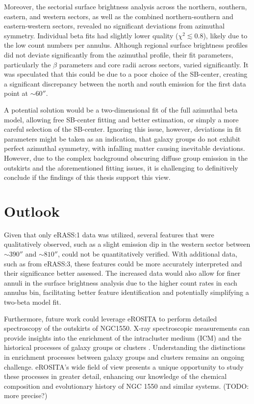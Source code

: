 Moreover, the sectorial surface brightness analysis across the northern, southern, eastern, and western sectors, as well as the combined northern-southern and eastern-western sectors, revealed no significant deviations from azimuthal symmetry. Individual beta fits had slightly lower quality (\(\chi^2 \lesssim 0.8\)), likely due to the low count numbers per annulus. Although regional surface brightness profiles did not deviate significantly from the azimuthal profile, their fit parameters, particularly the \(\beta\) parameters and core radii across sectors, varied significantly. It was speculated that this could be due to a poor choice of the SB-center, creating a significant discrepancy between the north and south emission for the first data point at \(\sim 60''\). 

A potential solution would be a two-dimensional fit of the full azimuthal beta model, allowing free SB-center fitting and better estimation, or simply a more careful selection of the SB-center. Ignoring this issue, however, deviations in fit parameters might be taken as an indication, that galaxy groups do not exhibit perfect azimuthal symmetry, with infalling matter causing inevitable deviations. However, due to the complex background obscuring diffuse group emission in the outskirts and the aforementioned fitting issues, it is challenging to definitively conclude if the findings of this thesis support this view.
\section{Outlook}
Given that only eRASS:1 data was utilized, several features that were qualitatively observed, such as a slight emission dip in the western sector between \(\sim 390''\) and \(\sim 810''\), could not be quantitatively verified. With additional data, such as from eRASS:3, these features could be more accurately interpreted and their significance better assessed. The increased data would also allow for finer annuli in the surface brightness analysis due to the higher count rates in each annulus bin, facilitating better feature identification and potentially simplifying a two-beta model fit.

Furthermore, future work could leverage eROSITA to perform detailed spectroscopy of the outskirts of NGC1550. X-ray spectroscopic measurements can provide insights into the enrichment of the intracluster medium (ICM) and the historical processes of galaxy groups or clusters \cite{Liu2020}. Understanding the distinctions in enrichment processes between galaxy groups and clusters remains an ongoing challenge. eROSITA's wide field of view presents a unique opportunity to study these processes in greater detail, enhancing our knowledge of the chemical composition and evolutionary history of NGC 1550 and similar systems. (TODO: more precise?)